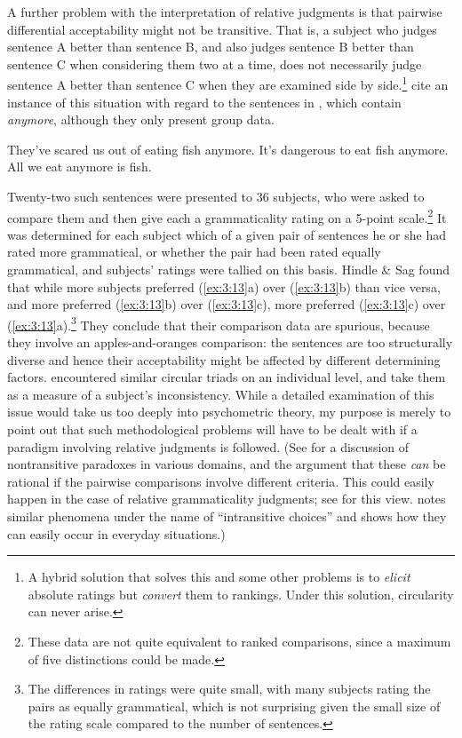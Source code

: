 A further problem with the interpretation of relative judgments is that pairwise differential acceptability might not be transitive. That is, a subject who judges sentence A better than sentence B, and also judges sentence B better than sentence C when considering them two at a time, does not necessarily judge sentence A better than sentence C when they are examined side by side.\footnote{A hybrid solution that solves this and some other problems is to \textit{elicit} absolute ratings but
\textit{convert} them to rankings. Under this solution, circularity can never arise.}
\citet{HindleEtAl1975} cite an instance of this situation with regard to the sentences in , which contain \textit{anymore}, although they only present group data.

\ea \label{ex:3:13}
\ea They've scared us out of eating fish anymore. 
\ex It's dangerous to eat fish anymore.
\ex All we eat anymore is fish.
\z
\z

\noindent
Twenty-two such sentences were presented to 36 subjects, who were asked to compare them and then give each a grammaticality rating on a 5-point scale.\footnote{These data are not quite equivalent to ranked comparisons, since a maximum of five distinctions could be made.}
 It was determined for each subject which of a given pair of sentences he or she had rated more grammatical, or whether the pair had been rated equally grammatical, and subjects' ratings were tallied on this basis. Hindle \& Sag found that while more subjects preferred (\ref{ex:3:13}a) over (\ref{ex:3:13}b) than vice versa, and more preferred
(\ref{ex:3:13}b) over (\ref{ex:3:13}c), more preferred (\ref{ex:3:13}c) over (\ref{ex:3:13}a).\footnote{The differences in ratings were quite small, with many subjects rating the pairs as equally grammatical, which is not surprising given the small size of the rating scale compared to the number of sentences.}
 They conclude that their comparison data are spurious, because they involve an apples-and-oranges comparison: the sentences are too structurally diverse and hence their acceptability might be affected by different determining factors. \citet{DanksEtAl1970} encountered similar circular triads on an individual level, and take them as a measure of a subject's inconsistency. While a detailed examination of this issue would take us too deeply into psychometric theory, my purpose is merely to point out that such methodological problems will have to be dealt with if a paradigm involving relative judgments is followed. (See \citet{Gardner1974} for a discussion of nontransitive paradoxes in various domains, and the argument that these \textit{can} be rational if the pairwise comparisons involve different criteria. This could easily happen in the case of relative grammaticality judgments; see \citet{Watt1975} for this view. \citet{Einhorn1982} notes similar phenomena under the name of ``intransitive choices'' and shows how they can easily occur in everyday situations.)


